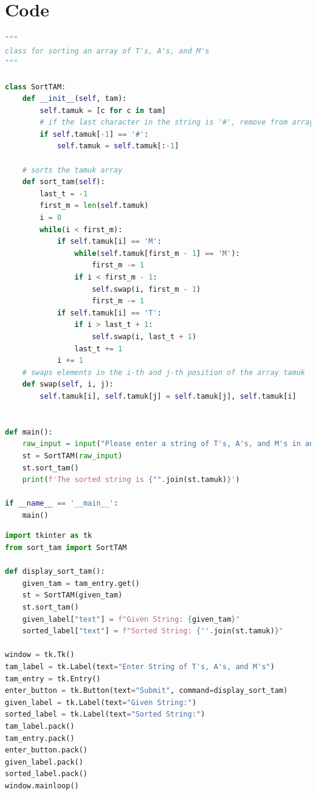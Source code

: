 \documentclass[12pt]{report}
\begin{document}
\chapter{Code}
\begin{lstlisting}[language=Python, caption=sort\_tam.py]
"""
class for sorting an array of T's, A's, and M's
"""

class SortTAM:
    def __init__(self, tam):
        self.tamuk = [c for c in tam]
        # if the last character in the string is '#', remove from array
        if self.tamuk[-1] == '#':
            self.tamuk = self.tamuk[:-1]
    
    # sorts the tamuk array
    def sort_tam(self):
        last_t = -1
        first_m = len(self.tamuk)
        i = 0
        while(i < first_m):
            if self.tamuk[i] == 'M':
                while(self.tamuk[first_m - 1] == 'M'):
                    first_m -= 1
                if i < first_m - 1:
                    self.swap(i, first_m - 1)
                    first_m -= 1
            if self.tamuk[i] == 'T':
                if i > last_t + 1:
                    self.swap(i, last_t + 1)
                last_t += 1
            i += 1
    # swaps elements in the i-th and j-th position of the array tamuk
    def swap(self, i, j):
        self.tamuk[i], self.tamuk[j] = self.tamuk[j], self.tamuk[i]


def main():
    raw_input = input("Please enter a string of T's, A's, and M's in any order (i.e. MMAATT):")
    st = SortTAM(raw_input)
    st.sort_tam()
    print(f'The sorted string is {"".join(st.tamuk)}')

if __name__ == '__main__':
    main()
\end{lstlisting}

\begin{lstlisting}[language=Python, caption=sort\_tam\_gui.py]
import tkinter as tk
from sort_tam import SortTAM

def display_sort_tam():
    given_tam = tam_entry.get()
    st = SortTAM(given_tam)
    st.sort_tam()
    given_label["text"] = f"Given String: {given_tam}"
    sorted_label["text"] = f"Sorted String: {''.join(st.tamuk)}"

window = tk.Tk()
tam_label = tk.Label(text="Enter String of T's, A's, and M's")
tam_entry = tk.Entry()
enter_button = tk.Button(text="Submit", command=display_sort_tam)
given_label = tk.Label(text="Given String:")
sorted_label = tk.Label(text="Sorted String:")
tam_label.pack()
tam_entry.pack()
enter_button.pack()
given_label.pack()
sorted_label.pack()
window.mainloop()
\end{lstlisting}
\end{document}
